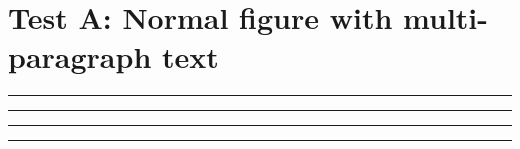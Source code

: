 \documentclass[11pt,a4paper]{article}
\begin{document}
\section{Test A: Normal figure with multi-paragraph text}
\begin{swarmwrap}%
  \begin{minipage}[t]{3cm}
    \centering
    \textcolor{red!30}{\rule{\linewidth}{3cm}}
  \end{minipage}%
\end{swarmwrap}%
\swarmwrapnext\lipsum[1]\lipsum[2]

\begin{swarmwrap}%
  \begin{minipage}[t]{4cm}
    \centering
    \textcolor{blue!30}{\rule{\linewidth}{5cm}}
  \end{minipage}%
\end{swarmwrap}%
\swarmwrapnext\lipsum[1]\lipsum[2]\lipsum[3]

\begin{swarmwrap}%
  \begin{minipage}[t]{2cm}
    \centering
    \textcolor{green!30}{\rule{\linewidth}{8cm}}
  \end{minipage}%
\end{swarmwrap}%
\swarmwrapnext\lipsum[1]\lipsum[2]

\begin{swarmwrap}%
  \begin{minipage}[t]{5cm}
    \centering
    \textcolor{orange!30}{\rule{\linewidth}{3cm}}
  \end{minipage}%
\end{swarmwrap}%
\swarmwrapnext\lipsum[1]\lipsum[2]
\end{document}
